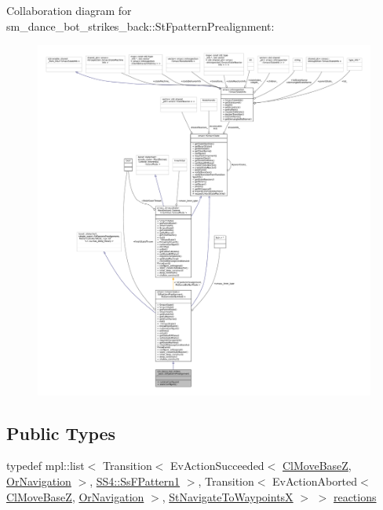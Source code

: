 Collaboration diagram for sm\+\_\+dance\+\_\+bot\+\_\+strikes\+\_\+back\+:\+:St\+Fpattern\+Prealignment\+:
\nopagebreak
\begin{figure}[H]
\begin{center}
\leavevmode
\includegraphics[width=350pt]{structsm__dance__bot__strikes__back_1_1StFpatternPrealignment__coll__graph}
\end{center}
\end{figure}
\subsection*{Public Types}
\begin{DoxyCompactItemize}
\item 
typedef mpl\+::list$<$ Transition$<$ Ev\+Action\+Succeeded$<$ \hyperlink{classmove__base__z__client_1_1ClMoveBaseZ}{Cl\+Move\+BaseZ}, \hyperlink{classsm__dance__bot__strikes__back_1_1OrNavigation}{Or\+Navigation} $>$, \hyperlink{structsm__dance__bot__strikes__back_1_1SS4_1_1SsFPattern1}{S\+S4\+::\+Ss\+F\+Pattern1} $>$, Transition$<$ Ev\+Action\+Aborted$<$ \hyperlink{classmove__base__z__client_1_1ClMoveBaseZ}{Cl\+Move\+BaseZ}, \hyperlink{classsm__dance__bot__strikes__back_1_1OrNavigation}{Or\+Navigation} $>$, \hyperlink{structsm__dance__bot__strikes__back_1_1StNavigateToWaypointsX}{St\+Navigate\+To\+WaypointsX} $>$ $>$ \hyperlink{structsm__dance__bot__strikes__back_1_1StFpatternPrealignment_a2954d92b15e04cee07bd0a5172df7f59}{reactions}
\end{DoxyCompactItemize}
